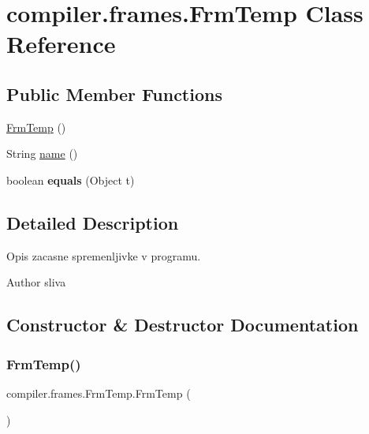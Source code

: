 \hypertarget{classcompiler_1_1frames_1_1_frm_temp}{}\section{compiler.\+frames.\+Frm\+Temp Class Reference}
\label{classcompiler_1_1frames_1_1_frm_temp}
\subsection*{Public Member Functions}
\begin{DoxyCompactItemize}
\item 
\hyperlink{classcompiler_1_1frames_1_1_frm_temp_a85e7dfe279dc17d76a75f808014d2139}{Frm\+Temp} ()
\item 
String \hyperlink{classcompiler_1_1frames_1_1_frm_temp_ae7e5fb79f467287ba99429b89572e575}{name} ()
\item 
\mbox{\label{classcompiler_1_1frames_1_1_frm_temp_ab3ca269362447c416d9b7325f841752e}} 
boolean {\bfseries equals} (Object t)
\end{DoxyCompactItemize}


\subsection{Detailed Description}
Opis zacasne spremenljivke v programu.

\begin{DoxyAuthor}{Author}
sliva 
\end{DoxyAuthor}


\subsection{Constructor \& Destructor Documentation}
\mbox{\label{classcompiler_1_1frames_1_1_frm_temp_a85e7dfe279dc17d76a75f808014d2139}} 
\subsubsection{\texorpdfstring{Frm\+Temp()}{FrmTemp()}}
{\footnotesize\ttfamily compiler.\+frames.\+Frm\+Temp.\+Frm\+Temp (\begin{DoxyParamCaption}{ }\end{DoxyParamCaption})}

